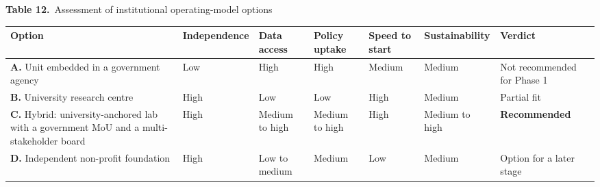 \documentclass[border=10pt]{standalone}
\begin{document}
\begin{minipage}{22cm}
{\large\bfseries Table 12.}\ {\large Assessment of institutional operating-model options}\par\vspace{7pt}
\small
{}
\begin{tabularx}{\linewidth}{@{}>{\hsize=1.793\hsize\raggedright\arraybackslash}X>{\hsize=0.897\hsize\raggedright\arraybackslash}X>{\hsize=0.759\hsize\raggedright\arraybackslash}X>{\hsize=0.759\hsize\raggedright\arraybackslash}X>{\hsize=0.759\hsize\raggedright\arraybackslash}X>{\hsize=0.931\hsize\raggedright\arraybackslash}X>{\hsize=1.103\hsize\raggedright\arraybackslash}X@{}}
\arrayrulecolor{bapilrule}\toprule
\rowcolor{white}\textbf{Option} & \textbf{Independence} & \textbf{Data access} & \textbf{Policy uptake} & \textbf{Speed to start} & \textbf{Sustainability} & \textbf{Verdict} \\
\midrule
\textbf{A.} Unit embedded in a government agency & Low & High & High & Medium & Medium & Not recommended for Phase 1 \\
\textbf{B.} University research centre & High & Low & Low & High & Medium & Partial fit \\
\textbf{C.} Hybrid: university-anchored lab with a government MoU and a multi-stakeholder board & High & Medium to high & Medium to high & High & Medium to high & \textbf{Recommended} \\
\textbf{D.} Independent non-profit foundation & High & Low to medium & Medium & Low & Medium & Option for a later stage \\
\bottomrule
\end{tabularx}
\par\vspace{5pt}{\footnotesize\itshape Qualitative assessment by the author against five criteria; to be validated in the Phase 1 feasibility study (Deliverable D1.3).}
\par{}
\end{minipage}
\end{document}
